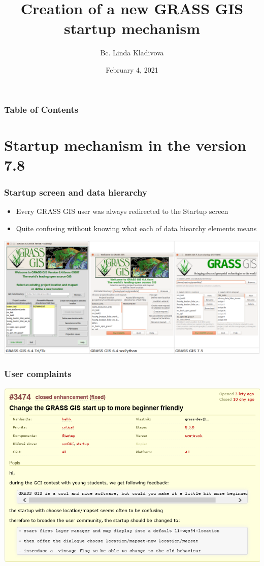 \documentclass[aspectratio=169]{beamer}
\title[Creation of a new GRASS GIS startup mechanism] %
{Creation of a new GRASS GIS startup mechanism}
\author[Bc. Linda Kladivova] %
{Bc. Linda Kladivova}
\institute[Department of Geomatics] %
{
  CTU in Prague\\
  Faculty of Civil Engineering\\
  Department of Geomatics\\
  [8ex]
{\small Supervisor: Ing. Martin Landa, Ph.D.}
}
\date[February 4, 2021] %
{February 4, 2021}
\begin{document}
\frame{\titlepage}

\begin{frame}
\frametitle{Table of Contents}
\tableofcontents
\end{frame}

\section{Startup mechanism in the version 7.8}
\begin{frame}
\frametitle{Startup screen and data hierarchy}
\begin{itemize}
\item	Every GRASS GIS user was always redirected to the Startup screen
\item	Quite confusing without knowing what each of data hiearchy elements means
\end{itemize}
		\centering
	        \includegraphics[width=0.8\columnwidth]{pictures/verze_startup.png}
\end{frame}

\begin{frame}
\frametitle{User complaints}
	        	\centering
	        \includegraphics[width=0.8\columnwidth]{pictures/ticket.PNG}
\end{frame}

\end{document}
